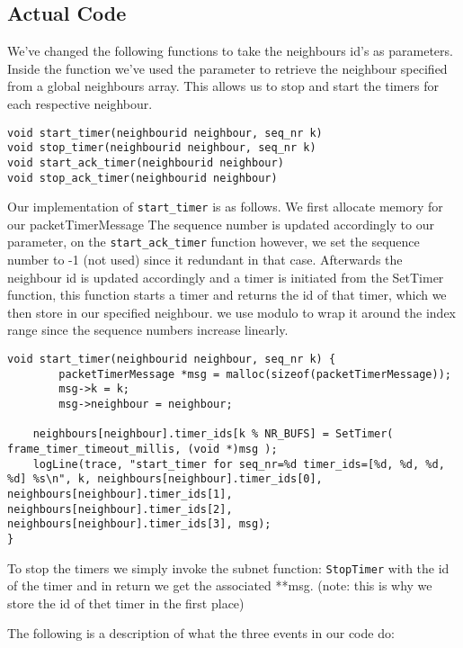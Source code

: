 \hfill \break
\subsection{Actual Code}




We've changed the following functions to take the neighbours id's as parameters.
Inside the function we've used the parameter to retrieve the neighbour specified from a global neighbours array.
This allows us to stop and start the timers for each respective neighbour.

\begin{lstlisting}
void start_timer(neighbourid neighbour, seq_nr k)
void stop_timer(neighbourid neighbour, seq_nr k)
void start_ack_timer(neighbourid neighbour)
void stop_ack_timer(neighbourid neighbour)
\end{lstlisting}


Our implementation of \texttt{start\_timer} is as follows. We first allocate memory for our {packetTimerMessage} 
The sequence number is updated accordingly to our parameter, on the \linebreak\texttt{start\_ack\_timer} function however, we set the sequence number to -1 (not used) since it redundant in that case.
Afterwards the neighbour id is updated accordingly and a timer is initiated from the SetTimer function, this function starts a timer and returns the id of that timer,
which we then store in our specified neighbour.
we use modulo to wrap it around the index range since the sequence numbers increase linearly.
\begin{lstlisting}
void start_timer(neighbourid neighbour, seq_nr k) {
        packetTimerMessage *msg = malloc(sizeof(packetTimerMessage));
        msg->k = k;
        msg->neighbour = neighbour;

	neighbours[neighbour].timer_ids[k % NR_BUFS] = SetTimer( frame_timer_timeout_millis, (void *)msg );
	logLine(trace, "start_timer for seq_nr=%d timer_ids=[%d, %d, %d, %d] %s\n", k, neighbours[neighbour].timer_ids[0], neighbours[neighbour].timer_ids[1], neighbours[neighbour].timer_ids[2], neighbours[neighbour].timer_ids[3], msg);
}
\end{lstlisting}


To stop the timers we simply invoke the subnet function: \texttt{StopTimer} with the id of the timer
and in return we get the associated **msg. (note: this is why we store the id of thet timer in the first place)


The following is a description of what the three events in our code do:
\\

